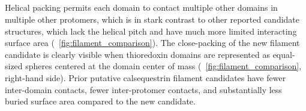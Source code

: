 \subsection{\headingsubsectionthree}
Helical packing permits each domain to contact multiple other domains in multiple other protomers, which is in stark contrast to other reported candidate structures, which lack the helical pitch and have much more limited interacting surface area (\extendeddatafigure~\ref{fig:filament_comparison}). The close-packing of the new filament candidate is clearly visible when thioredoxin domains are represented as equal-sized spheres centered at the domain center of mass (\extendeddatafigure~\ref{fig:filament_comparison}, right-hand side). Prior putative calsequestrin filament candidates have fewer inter-domain contacts, fewer inter-protomer contacts, and substantially less buried surface area compared to the new candidate. %

